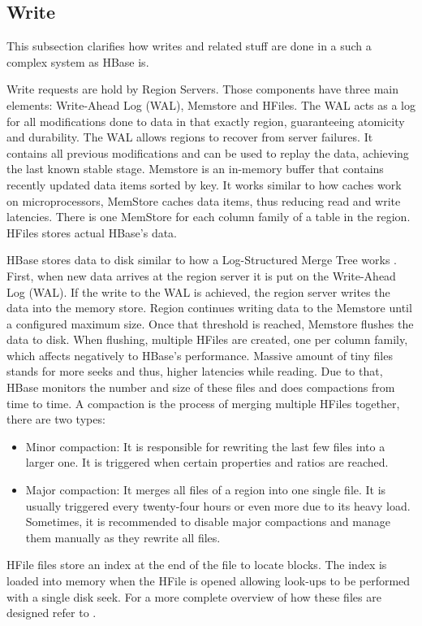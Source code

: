 \subsection {Write}
This subsection clarifies how writes and related stuff are done in a such a complex system as HBase is.
\par
Write requests are hold by Region Servers. Those components have three main elements: Write-Ahead Log (WAL), Memstore and HFiles. The WAL acts as a log for all modifications done to data in that exactly region, guaranteeing atomicity and durability. The WAL allows regions to recover from server failures. It contains all previous modifications and can be used to replay the data, achieving the last known stable stage. Memstore is an in-memory buffer that contains recently updated data items sorted by key. It works similar to how caches work on microprocessors, MemStore caches data items, thus reducing read and write latencies. There is one MemStore for each column family of a table in the region. HFiles stores actual HBase's data.
\par
HBase stores data to disk similar to how a Log-Structured Merge Tree works \cite{o1996log}. First, when new data arrives at the region server it is put on the Write-Ahead Log (WAL). If the write to the WAL is achieved, the region server writes the data into the memory store. Region continues writing data to the Memstore until a configured maximum size. Once that threshold is reached, Memstore flushes the data to disk. When flushing, multiple HFiles are created, one per column family, which affects negatively to HBase's performance. Massive amount of tiny files stands for more seeks and thus, higher latencies while reading. Due to that, HBase monitors the number and size of these files and does compactions from time to time. A compaction is the process of merging multiple HFiles together, there are two types:
\begin{itemize}
\item Minor compaction: It is responsible for rewriting the last few files into a larger one. It is triggered when certain properties and ratios are reached.
\item Major compaction: It merges all files of a region into one single file. It is usually triggered every twenty-four hours or even more due to its heavy load. Sometimes, it is recommended to disable major compactions and manage them manually as they rewrite all files.
\end{itemize}

HFile files store an index at the end of the file to locate blocks. The index is loaded into memory when the HFile is opened allowing look-ups to be performed with a single disk seek. For a more complete overview of how these files are designed refer to \cite{white2012hadoop}.

